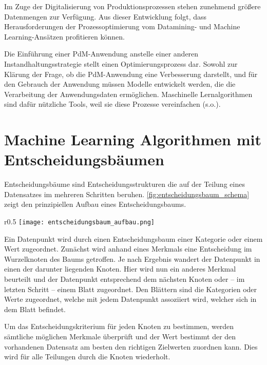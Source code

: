 Im Zuge der Digitalisierung von Produktionsprozessen stehen zunehmend größere Datenmengen zur Verfügung. Aus dieser Entwicklung folgt, dass Herausforderungen der Prozessoptimierung vom Datamining- und Machine Learning-Ansätzen profitieren können.~\cite[S.~35]{Schafer.2019}

Die Einführung einer PdM-Anwendung anstelle einer anderen Instandhaltungsstrategie stellt einen Optimierungsprozess dar. Sowohl zur Klärung der Frage, ob die PdM-Anwendung eine Verbesserung darstellt, und für den Gebrauch der Anwendung müssen Modelle entwickelt werden, die die Verarbeitung der Anwendungsdaten ermöglichen. Maschinelle Lernalgorithmen sind dafür nützliche Tools, weil sie diese Prozesse vereinfachen (s.o.).
\section{Machine Learning Algorithmen mit Entscheidungsbäumen}
\label{sec:algorithmen_mit_entscheidungsbaum}
Entscheidungsbäume sind Entscheidungsstrukturen die auf der Teilung eines Datensatzes im mehreren Schritten beruhen. \cref{fig:entscheidungsbaum_schema} zeigt den prinzipiellen Aufbau eines Entscheidungsbaums.

\begin{wrapfigure}{r}{0.5\textwidth}
	\centering
	\texttt{[image: entscheidungsbaum\_aufbau.png]}
	\caption{Schematische Darstellung eines Entscheidungsbaums}
	\label{fig:entscheidungsbaum_schema}
\end{wrapfigure}

Ein Datenpunkt wird durch einen Entscheidungsbaum einer Kategorie oder einem Wert zugeordnet. Zunächst wird anhand eines Merkmals eine Entscheidung im Wurzelknoten des Baums getroffen. Je nach Ergebnis wandert der Datenpunkt in einen der darunter liegenden Knoten. Hier wird nun ein anderes Merkmal beurteilt und der Datenpunkt entsprechend dem nächsten Knoten oder -- im letzten Schritt -- einem Blatt zugeordnet. Den Blättern sind die Kategorien oder Werte zugeordnet, welche mit jedem Datenpunkt assoziiert wird, welcher sich in dem Blatt befindet. 

Um das Entscheidungskriterium für jeden Knoten zu bestimmen, werden sämtliche möglichen Merkmale überprüft und der Wert bestimmt der den vorhandenen Datensatz am besten den richtigen Zielwerten zuordnen kann. Dies wird für alle Teilungen durch die Knoten wiederholt.~\cite{Muller.2017}

